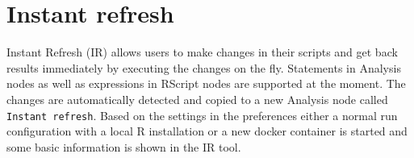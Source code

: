 

\chapter{Instant refresh}\label{chap:Instant refresh}
Instant Refresh (IR) allows users to make changes in their scripts and
get back results immediately by executing the changes on the fly.
Statements in Analysis nodes as well as expressions in RScript nodes are supported
at the moment. The changes are automatically detected and copied to a new Analysis
node called \texttt{Instant refresh}. Based on the settings in the preferences either
a normal run configuration with a local R installation or a new docker container
is started and some basic information is shown in the IR tool. 


